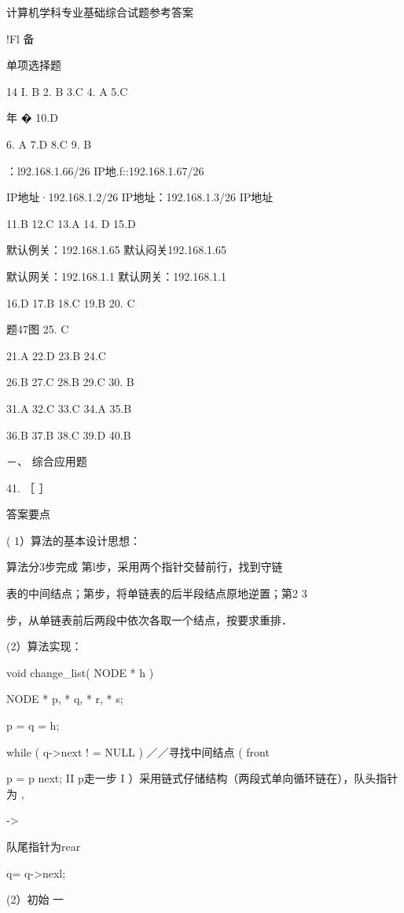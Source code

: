 {{    计算机学科专业基础综合试题参考答案


    !Fl    备

    单项选择题

    14    I. B    2. B    3.C    4. A    5.C

    年   �    10.D

    6. A    7.D    8.C    9. B

    ：l92.168.1.66/26    IP地.f::192.168.1.67/26

IP地址·192.168.1.2/26    IP地址：192.168.1.3/26   IP地址

    11.B    12.C    13.A    14. D    15.D

    默认例关：192.168.1.65    默认闷关192.168.1.65

默认网关：192.168.1.1     默认网关：192.168.1.1

    16.D    17.B    18.C    19.B    20. C

    题47图    25. C

    21.A    22.D    23.B    24.C

    26.B    27.C    28.B    29.C    30. B

    31.A    32.C    33.C    34.A    35.B

    36.B    37.B    38.C    39.D    40.B

    －、  综合应用题

    41. ［    ］

    答案要点

    ( 1）算法的基本设计思想：

    算法分3步完成  第l步，采用两个指针交替前行，找到守链

    表的中间结点；第步，将单链表的后半段结点原地逆置；第2    3

    步，从单链表前后两段中依次各取一个结点，按要求重排．

    (2）算法实现：

    void change_list( NODE * h )

    NODE * p,  * q,  * r,  * s;

    p = q = h;

    while ( q->next !  = NULL )     ／／寻找中间结点    (    front

    p = p  next;     II p走一步    I ）采用链式仔储结构（两段式单向循环链在），队头指针为    ,

    ->

    队尾指针为rear

    q= q->nexl;

    (2）初始    一

}}
